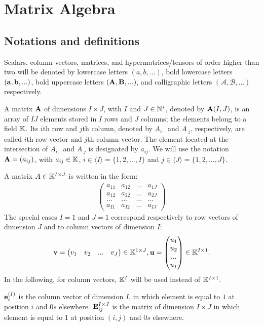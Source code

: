 \chapter{Matrix Algebra}

\section{Notations and definitions}

Scalars, column vectors, matrices, and hypermatrices/tensors of order higher than two will be 
denoted by lowercase letters $(a,b,...)$, 
bold lowercase letters $(\bold{a,b},...)$,
bold uppercase letters $(\bold{A},\bold{B},...)$,
and calligraphic letters $(\mathcal{A},\mathcal{B},...)$ respectively.

\par
A matrix $\bold{A}$ of dimensions $I\times J$, with $I$ and $J\in \mathbb{N}^*$,
denoted by $\bold{A}(I,J)$, is an array of $IJ$ elements stored in $I$ rows and 
$J$ columns; the elements belong to a field $\mathbb{K}$. Its $i$th row and
$j$th column, denoted by $A_{i\cdot}$ and $A_{\cdot j}$, respectively, are called $i$th row vector and
$j$th column vector. The element located at the intersection of $A_{i\cdot}$ and $A_{\cdot j}$ is 
designated by $a_{ij}$. We will use the notation $\bold{A}=(a_{ij})$, 
with $a_{ij}\in\mathbb{K}$, $i\in \langle {I} \rangle=\{1,2,...,I\}$ and 
$j\in \langle{J} \rangle=\{1,2,...,J\}$.
\par
A matrix $A\in\mathbb{K}^{I\times J}$ is written in the form:
\begin{align*}
    \begin{pmatrix}
        a_{11}& a_{12} & ... & a_{1J} \\
        a_{12}& a_{22} & ... & a_{2J} \\
        ...& ...  & ... & ...\\
        a_{I1}& a_{I2}  & ... & a_{IJ}
      \end{pmatrix}
\end{align*} 
The special cases $I=1$ and $J=1$ correspond respectively to row vectors of dimension $J$ 
and to column vectors of dimension $I$:
\begin{align*}
    \bold{v}=\begin{pmatrix}
        v_1& v_{2} & ... & v_{J} 
      \end{pmatrix}\in \mathbb{K}^{1\times J},
    \bold{u}=\begin{pmatrix}
        u_1\\ u_{2} \\ ... \\ u_{I} 
      \end{pmatrix}\in \mathbb{K}^{I\times 1}.
\end{align*}
In the following, for column vectors, $\mathbb{K}^{I}$ will be used instead of $\mathbb{K}^{I\times 1}$.
\par
$\bold{e}_{i}^{(I)}$ is the column vector of dimension $I$,
in which element is equal to $1$ at position $i$ and $0s$ elsewhere.
$\bold{E}_{ij}^{I\times J}$ is the matrix of dimension $I\times J$
in which element is equal to $1$ at position $(i,j)$ and $0s$ elsewhere.

